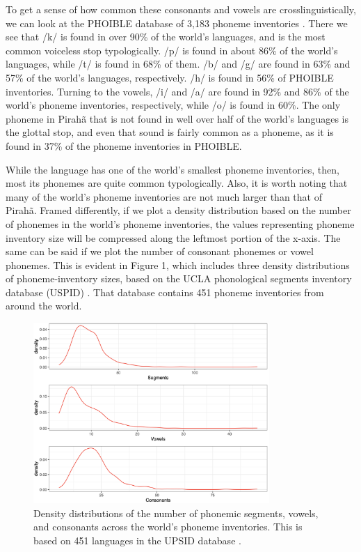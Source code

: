 \documentclass[output=paper,colorlinks,citecolor=brown
]{langscibook}
\begin{document}
    To get a sense of how common these consonants and vowels are crosslinguistically, we can look at the PHOIBLE database of 3,183 phoneme inventories \citep{phoible}. There we see that /k/ is found in over 90\% of the world’s languages, and is the most common voiceless stop typologically. /p/ is found in about 86\% of the world’s languages, while /t/ is found in 68\% of them. /b/ and /g/ are found in 63\% and 57\% of the world’s languages, respectively. /h/ is found in 56\% of PHOIBLE inventories. Turning to the vowels, /i/ and /a/ are found in 92\% and 86\% of the world’s phoneme inventories, respectively, while /o/ is found in 60\%. The only phoneme in Pirahã that is not found in well over half of the world’s languages is the glottal stop, and even that sound is fairly common as a phoneme, as it is found in 37\% of the phoneme inventories in PHOIBLE.

    While the language has one of the world’s smallest phoneme inventories, then, most its phonemes are quite common typologically. Also, it is worth noting that many of the world's phoneme inventories are not much larger than that of Pirahã. Framed differently, if we plot a density distribution based on the number of phonemes in the world’s phoneme inventories, the values representing phoneme inventory size will be compressed along the leftmost portion of the x-axis. The same can be said if we plot the number of consonant phonemes or vowel phonemes. This is evident in Figure 1, which includes three density distributions of phoneme-inventory sizes, based on the UCLA phonological segments inventory database (USPID) \citep{maddieson1989updating}. That database contains 451 phoneme inventories from around the world.

    
\begin{figure}
\centering
\includegraphics[width=0.8\textwidth]{figures/everett_figure1.png}
\caption{\label{fig:Figure 1}Density distributions of the number of phonemic segments, vowels, and consonants across the world’s phoneme inventories. This is based on 451 languages in the UPSID database \citep{maddieson1989updating}. }
\end{figure}
\end{document}
